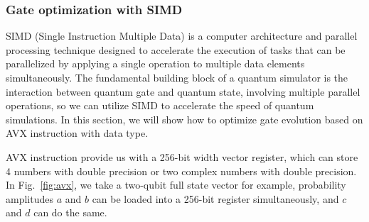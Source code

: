 \subsubsection{Gate optimization with SIMD}
SIMD (Single Instruction Multiple Data) is a computer architecture and parallel processing technique designed to accelerate the execution of tasks that can be parallelized by applying a single operation to multiple data elements simultaneously. The fundamental building block of a quantum simulator is the interaction between quantum gate and quantum state, involving multiple parallel operations, so we can utilize SIMD to accelerate the speed of quantum simulations. In this section, we will show how to optimize gate evolution based on AVX instruction with  data type.

AVX instruction provide us with a 256-bit width vector register, which can store 4 numbers with double precision or two complex numbers with double precision. In Fig.~\ref{fig:avx}, we take a two-qubit full state vector for example, probability amplitudes $a$ and $b$ can be loaded into a 256-bit register simultaneously, and $c$ and $d$ can do the same.
